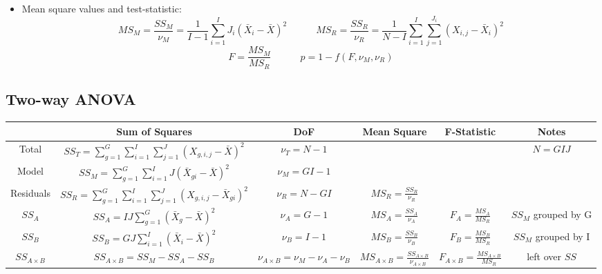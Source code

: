 \documentclass{article}
\begin{document}
\begin{itemize}
   \item Mean square values and test-statistic:
   \[MS_{M} = \frac{SS_{M}}{\nu_{M}} = \frac{1}{I-1}\sum^{I}_{i=1}J_{i}(\bar{X}_{i}-\bar{X})^{2} \quad \quad \quad  MS_{R} = \frac{SS_{R}}{\nu_{R}} = \frac{1}{N-I} \sum_{i=1}^{I}\sum_{j=1}^{J_{i}}(X_{i,j}-\bar{X}_{i})^{2}\]
   \[F = \frac{MS_{M}}{MS_{R}} \quad \quad \quad p =1-f(F, \nu_{M}, \nu_{R})\]
\end{itemize}


\subsection*{Two-way ANOVA}
        \begin{table}[H]
        \begin{adjustbox}{width=\columnwidth,center}
        \begin{tabular}{c|c|c|c|c|c}
        & Sum of Squares & DoF & Mean Square & F-Statistic & Notes \\ \hline
        Total & $\displaystyle SS_{T} = \sum_{g=1}^{G}\sum_{i=1}^{I}\sum_{j=1}^{J}(X_{g,i,j}-\bar{X})^{2}$ & $\displaystyle \nu_{T}=N-1$ & & & $N=GIJ$\\ \hline

        Model & $\displaystyle SS_{M} = \sum_{g=1}^{G}\sum^{I}_{i=1}J(\bar{X}_{gi}-\bar{X})^{2}$ & $\displaystyle \nu_{M}=GI-1$ & & &\\ \hline
         
        Residuals & $\displaystyle SS_{R} = \sum_{g=1}^{G}\sum_{i=1}^{I}\sum_{j=1}^{J}(X_{g,i,j}-\bar{X}_{gi})^{2}$ & $\displaystyle \nu_{R} = N-GI$ & $\displaystyle MS_{R} = \frac{SS_{R}}{\nu_{R}}$ & & \\ \hline
         
        $SS_{A}$  & $\displaystyle SS_{A} = IJ \sum_{g=1}^{G}(\bar{X}_{g}-\bar{X})^{2}$ & $\displaystyle \nu_{A} = G-1$ & $\displaystyle MS_{A} = \frac{SS_{A}}{\nu_{A}}$ & $\displaystyle F_{A} = \frac{MS_{A}}{MS_{R}}$ & $SS_{M}$ grouped by G\\ \hline
         
        $SS_{B}$  & $\displaystyle SS_{B} = GJ \sum_{i=1}^{I}(\bar{X}_{i}-\bar{X})^{2}$ & $\displaystyle \nu_{B} = I-1$ & $\displaystyle MS_{B} = \frac{SS_{B}}{\nu_{B}}$ & $\displaystyle F_{B} = \frac{MS_{B}}{MS_{R}}$ & $SS_{M}$ grouped by I\\ \hline
         
        $SS_{A \times B}$  & $\displaystyle SS_{A \times B} = SS_{M}-SS_{A}-SS_{B}$ & $\displaystyle \nu_{A \times B} = \nu_{M}-\nu_{A}-\nu_{B}$ & $\displaystyle MS_{A\times B} = \frac{SS_{A\times B}}{\nu_{A\times B}}$ & $\displaystyle F_{A\times B} = \frac{MS_{A\times B}}{MS_{R}}$ & left over $SS$\\
         \end{tabular}
         \end{adjustbox}
        \end{table}
\end{document}
